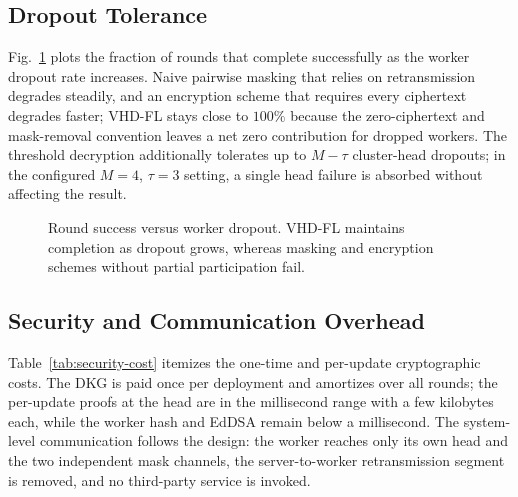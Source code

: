\subsection{Dropout Tolerance}
\label{subsec:dropout}
Fig.~\ref{fig:dropout} plots the fraction of rounds that complete successfully as the worker dropout rate increases. Naive pairwise masking that relies on retransmission degrades steadily, and an encryption scheme that requires every ciphertext degrades faster; \textsc{VHD-FL} stays close to $100\%$ because the zero-ciphertext and mask-removal convention leaves a net zero contribution for dropped workers. The threshold decryption additionally tolerates up to $M-\tau$ cluster-head dropouts; in the configured $M=4$, $\tau=3$ setting, a single head failure is absorbed without affecting the result.

\begin{figure}[t]
\centering
{}
\caption{Round success versus worker dropout. \textsc{VHD-FL} maintains completion as dropout grows, whereas masking and encryption schemes without partial participation fail.}
\label{fig:dropout}
\end{figure}

\subsection{Security and Communication Overhead}
\label{subsec:security-overhead}
Table~\ref{tab:security-cost} itemizes the one-time and per-update cryptographic costs. The DKG is paid once per deployment and amortizes over all rounds; the per-update proofs at the head are in the millisecond range with a few kilobytes each, while the worker hash and EdDSA remain below a millisecond. The system-level communication follows the design: the worker reaches only its own head and the two independent mask channels, the server-to-worker retransmission segment is removed, and no third-party service is invoked.

